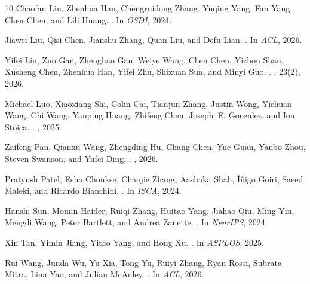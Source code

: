 \begin{thebibliography}{10}
Chaofan Lin, Zhenhua Han, Chengruidong Zhang, Yuqing Yang, Fan Yang, Chen Chen,
  and Lili Huang.
.
\newblock In {\em OSDI}, 2024.

Jiawei Liu, Qisi Chen, Jianshu Zhang, Quan Liu, and Defu Lian.
.
\newblock In {\em ACL}, 2026.

Yifei Liu, Zuo Gan, Zhenghao Gan, Weiye Wang, Chen Chen, Yizhou Shan, Xusheng
  Chen, Zhenhua Han, Yifei Zhu, Shixuan Sun, and Minyi Guo.
.
,
  23(2), 2026.

Michael Luo, Xiaoxiang Shi, Colin Cai, Tianjun Zhang, Justin Wong, Yichuan
  Wang, Chi Wang, Yanping Huang, Zhifeng Chen, Joseph~E. Gonzalez, and Ion
  Stoica.
.
, 2025.

Zaifeng Pan, Qianxu Wang, Zhengding Hu, Chang Chen, Yue Guan, Yanbo Zhou,
  Steven Swanson, and Yufei Ding.
.
, 2026.

Pratyush Patel, Esha Choukse, Chaojie Zhang, Aashaka Shah, {\'I}{\~n}igo Goiri,
  Saeed Maleki, and Ricardo Bianchini.
.
\newblock In {\em ISCA}, 2024.

Hanshi Sun, Momin Haider, Ruiqi Zhang, Huitao Yang, Jiahao Qiu, Ming Yin,
  Mengdi Wang, Peter Bartlett, and Andrea Zanette.
.
\newblock In {\em NeurIPS}, 2024.

Xin Tan, Yimin Jiang, Yitao Yang, and Hong Xu.
.
\newblock In {\em ASPLOS}, 2025.

Rui Wang, Junda Wu, Yu Xia, Tong Yu, Ruiyi Zhang, Ryan Rossi, Subrata Mitra,
  Lina Yao, and Julian McAuley.
.
\newblock In {\em ACL}, 2026.


\end{thebibliography}
